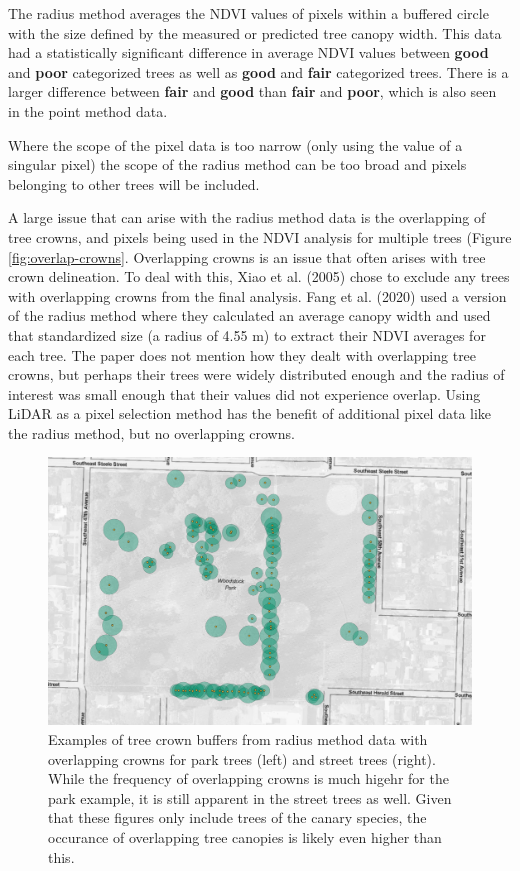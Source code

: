 \documentclass[12pt,twoside]{reedthesis}
\begin{document}
The radius method averages the NDVI values of pixels within a buffered
circle with the size defined by the measured or predicted tree canopy
width. This data had a statistically significant difference in average
NDVI values between \textbf{good} and \textbf{poor} categorized trees as well as
\textbf{good} and \textbf{fair} categorized trees. There is a larger difference
between \textbf{fair} and \textbf{good} than \textbf{fair} and \textbf{poor}, which is also
seen in the point method data.

Where the scope of the pixel data is too narrow (only using the value of
a singular pixel) the scope of the radius method can be too broad and
pixels belonging to other trees will be included.

A large issue that can arise with the radius method data is the
overlapping of tree crowns, and pixels being used in the NDVI analysis
for multiple trees (Figure \ref{fig:overlap-crowns}. Overlapping crowns
is an issue that often arises with tree crown delineation. To deal with
this, Xiao et al. (2005) chose to exclude any trees with overlapping crowns from
the final analysis. Fang et al. (2020) used a version of the radius method where
they calculated an average canopy width and used that standardized size
(a radius of 4.55 m) to extract their NDVI averages for each tree. The
paper does not mention how they dealt with overlapping tree crowns, but
perhaps their trees were widely distributed enough and the radius of
interest was small enough that their values did not experience overlap.
Using LiDAR as a pixel selection method has the benefit of additional
pixel data like the radius method, but no overlapping crowns.
\begin{figure}

{\centering \includegraphics[width=0.5\linewidth]{figure/overlapping_park} 

}

\caption[Examples of overlapping park and street tree crowns.]{Examples of tree crown buffers from radius method data with overlapping crowns for park trees (left) and street trees (right). While the frequency of overlapping crowns is much higehr for the park example, it is still apparent in the street trees as well. Given that these figures only include trees of the canary species, the occurance of overlapping tree canopies is likely even higher than this.}\label{fig:overlap-crowns-1}
\end{figure}
\end{document}
